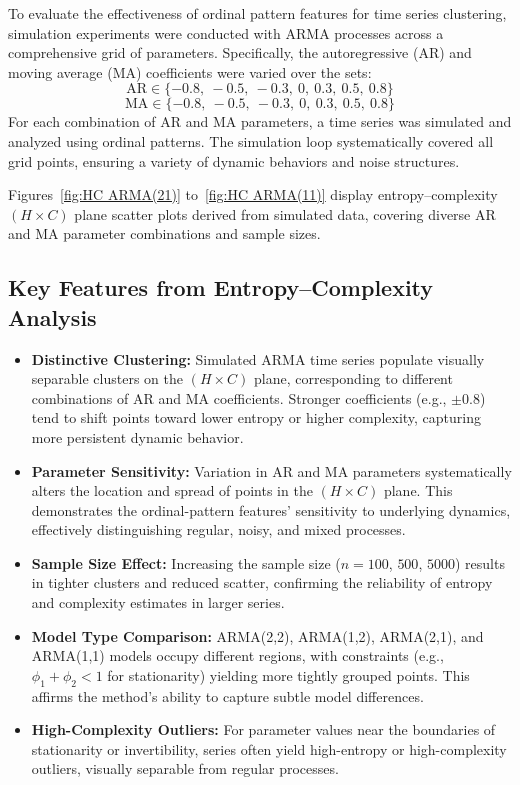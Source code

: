 \documentclass[12pt,a4paper]{article}
\begin{document}
To evaluate the effectiveness of ordinal pattern features for time series clustering, simulation experiments were conducted with ARMA processes across a comprehensive grid of parameters. Specifically, the autoregressive (AR) and moving average (MA) coefficients were varied over the sets:
\[
\text{AR} \in \{-0.8,\ -0.5,\ -0.3,\ 0,\ 0.3,\ 0.5,\ 0.8\}
\]
\[
\text{MA} \in \{-0.8,\ -0.5,\ -0.3,\ 0,\ 0.3,\ 0.5,\ 0.8\}
\]
For each combination of AR and MA parameters, a time series was simulated and analyzed using ordinal patterns. The simulation loop systematically covered all grid points, ensuring a variety of dynamic behaviors and noise structures.

Figures~\ref{fig:HC ARMA(21)} to~\ref{fig:HC ARMA(11)}  display entropy–complexity $(H \times C)$ plane scatter plots derived from simulated data, covering diverse AR and MA parameter combinations and sample sizes.

\subsection{Key Features from Entropy–Complexity Analysis}

\begin{itemize}
	\item \textbf{Distinctive Clustering:} Simulated ARMA time series populate visually separable clusters on the $(H \times C)$ plane, corresponding to different combinations of AR and MA coefficients. Stronger coefficients (e.g., $\pm0.8$) tend to shift points toward lower entropy or higher complexity, capturing more persistent dynamic behavior.
	\item \textbf{Parameter Sensitivity:} Variation in AR and MA parameters systematically alters the location and spread of points in the $(H \times C)$ plane. This demonstrates the ordinal-pattern features' sensitivity to underlying dynamics, effectively distinguishing regular, noisy, and mixed processes.
	\item \textbf{Sample Size Effect:} Increasing the sample size ($n=100$, $500$, $5000$) results in tighter clusters and reduced scatter, confirming the reliability of entropy and complexity estimates in larger series.
	\item \textbf{Model Type Comparison:} ARMA(2,2), ARMA(1,2),  ARMA(2,1), and ARMA(1,1) models occupy different regions, with constraints (e.g., $\phi_1 + \phi_2 < 1$ for stationarity) yielding more tightly grouped points. This affirms the method's ability to capture subtle model differences.
	\item \textbf{High-Complexity Outliers:} For parameter values near the boundaries of stationarity or invertibility, series often yield high-entropy or high-complexity outliers, visually separable from regular processes.
\end{itemize}
\end{document}
